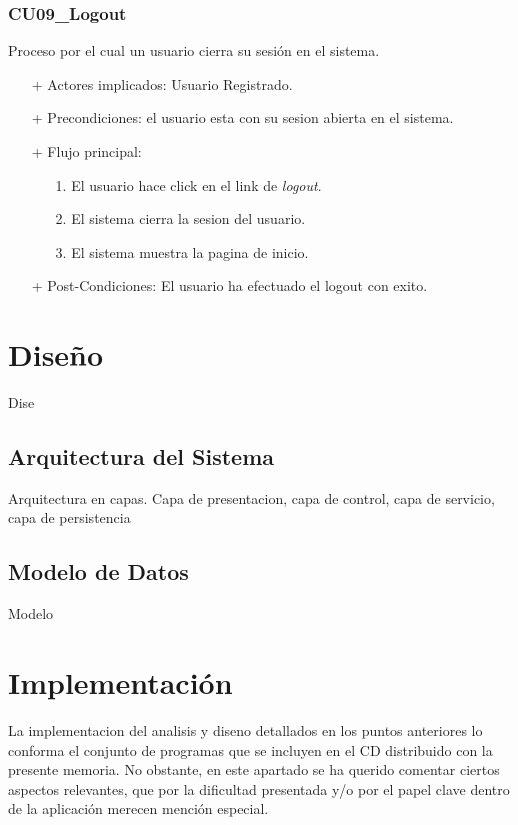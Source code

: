 \documentclass[a4paper]{report}
\begin{document}
            \subsubsection{CU09\_Logout}
                Proceso por el cual un usuario cierra su sesi\'on en el sistema.
                \begin{itemize}
                    \item[+] Actores implicados: Usuario Registrado.
                    \item[+] Precondiciones: el usuario esta con su sesion abierta en el sistema.
                    \item[+] Flujo principal:
                    \begin{enumerate}
                        \item[1.] El usuario hace click en el link de \emph{logout}.
                        \item[2.] El sistema cierra la sesion del usuario.
                        \item[3.] El sistema muestra la pagina de inicio.
                    \end{enumerate}
                    \item[+] Post-Condiciones: El usuario ha efectuado el logout con exito.
                \end{itemize}


    \section{Diseño}
    Dise
    \subsection{Arquitectura del Sistema}
    Arquitectura en capas. Capa de presentacion, capa de control, capa de servicio, capa de persistencia
    \subsection{Modelo de Datos}
    Modelo

    \section{Implementación}
    La implementacion del analisis y diseno detallados en los puntos anteriores lo conforma el conjunto de programas que se incluyen en el CD distribuido con la presente memoria. No obstante, en este apartado se ha querido comentar ciertos aspectos relevantes, que por la dificultad presentada y/o por el papel clave dentro de la aplicación merecen mención especial.
    
\end{document}
